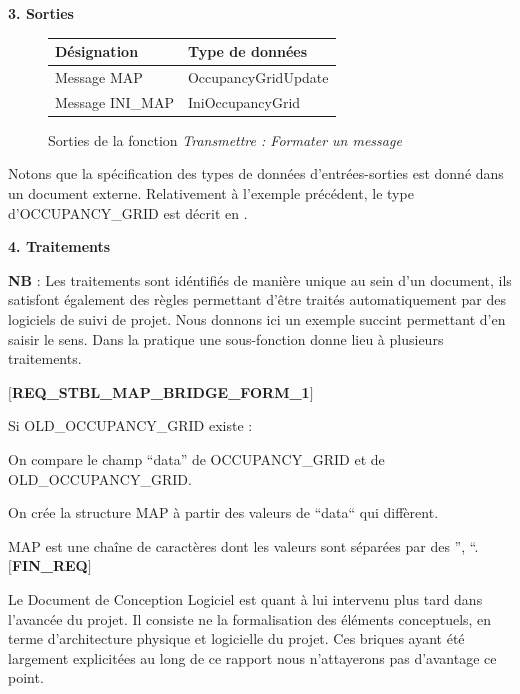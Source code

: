   \textbf{3. Sorties }
  \begin{figure}[!h]
    \begin{center}
      \begin{tabular}{|l|l|}
	\hline
	\textbf{Désignation} & \textbf{Type de données} \\
	\hline
	Message MAP & OccupancyGridUpdate \\
	Message INI\_MAP & IniOccupancyGrid \\
	\hline
      \end{tabular}
    \end{center}
    \caption{Sorties de la fonction \emph{Transmettre : Formater un message}}
  \end{figure}
  
  Notons que la spécification des types de données d'entrées-sorties est donné dans un document externe. 
  Relativement à l'exemple précédent, le type d'OCCUPANCY\_GRID est décrit en .  
  
  \textbf{4. Traitements }
  
  \textbf{NB} : Les traitements sont idéntifiés de manière unique au sein d'un document, ils satisfont également des règles permettant d'être traités automatiquement par des logiciels de suivi de projet. 
  Nous donnons ici un exemple succint permettant d'en saisir le sens. Dans la pratique une sous-fonction donne lieu à plusieurs traitements.
  
  \textbf{$[$REQ\_STBL\_MAP\_BRIDGE\_FORM\_1$]$}
  
    \hspace{10mm} Si OLD\_OCCUPANCY\_GRID existe : 
    
    \hspace{10mm} On compare le champ ``data'' de OCCUPANCY\_GRID et de OLD\_OCCUPANCY\_GRID. 
    
    \hspace{10mm} On crée la structure MAP à partir des valeurs de ``data`` qui diffèrent. 
    
    \hspace{10mm} MAP est une chaîne de caractères dont les valeurs sont séparées par des '', ``.\\ 
  \textbf{$[$FIN\_REQ$]$}
  
  Le Document de Conception Logiciel est quant à lui intervenu plus tard dans l'avancée du projet. 
  Il consiste ne la formalisation des éléments conceptuels, en terme d'architecture physique et logicielle du projet. 
  Ces briques ayant été largement explicitées au long de ce rapport nous n'attayerons pas d'avantage ce point. 
  
